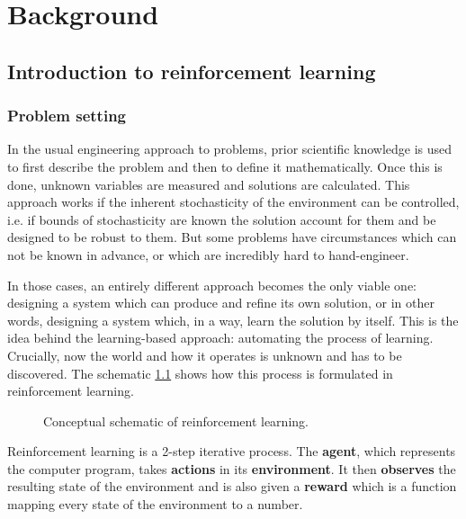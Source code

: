 \chapter{Background}
\section{Introduction to reinforcement learning}
\subsection{Problem setting}
In the usual engineering approach to problems,
prior scientific knowledge is used to first describe the problem
and then to define it mathematically.
Once this is done, unknown variables are measured and
solutions are calculated.
This approach works if the inherent stochasticity of the environment
can be controlled, i.e. if bounds of stochasticity are known
the solution account for them and be designed to be robust to them.
But some problems have circumstances which can not be known in advance,
or which are incredibly hard to hand-engineer.

In those cases, an entirely different approach becomes the only viable one:
designing a system which can produce and refine its own solution,
or in other words, designing a system which, in a way, learn the
solution by itself.
This is the idea behind the learning-based approach: automating the 
process of learning.
Crucially, now the world and how it operates
is unknown and has to be discovered.  
The schematic \ref{fig:rl-shematic} shows how this process is formulated in reinforcement learning.
\begin{figure}[htpb]
\begin{center}
\end{center}
\caption{Conceptual schematic of reinforcement learning.}
\label{fig:rl-shematic}
\end{figure}
Reinforcement learning is a 2-step iterative process.
The \textbf{agent}, which represents the computer program, takes \textbf{actions}
in its \textbf{environment}. It then \textbf{observes} the resulting state
of the environment and is also given a \textbf{reward}
which is a function mapping every state of the environment to a number.

